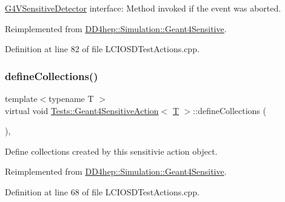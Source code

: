 \hyperlink{class_g4_v_sensitive_detector}{G4\+V\+Sensitive\+Detector} interface\+: Method invoked if the event was aborted. 



Reimplemented from \hyperlink{class_d_d4hep_1_1_simulation_1_1_geant4_sensitive_a3bb1c2f79261a98e83ec22102281d117}{D\+D4hep\+::\+Simulation\+::\+Geant4\+Sensitive}.



Definition at line 82 of file L\+C\+I\+O\+S\+D\+Test\+Actions.\+cpp.

\hypertarget{class_tests_1_1_geant4_sensitive_action_a0083f23f8b2160bc6e03ccd11077182c}{}\label{class_tests_1_1_geant4_sensitive_action_a0083f23f8b2160bc6e03ccd11077182c} 
\subsubsection{\texorpdfstring{define\+Collections()}{defineCollections()}\hspace{0.1cm}{\footnotesize\ttfamily [1/2]}}
{\footnotesize\ttfamily template$<$typename T $>$ \\
virtual void \hyperlink{class_tests_1_1_geant4_sensitive_action}{Tests\+::\+Geant4\+Sensitive\+Action}$<$ \hyperlink{class_t}{T} $>$\+::define\+Collections (\begin{DoxyParamCaption}{ }\end{DoxyParamCaption})\hspace{0.3cm}{\ttfamily [inline]}, {\ttfamily [virtual]}}



Define collections created by this sensitivie action object. 



Reimplemented from \hyperlink{class_d_d4hep_1_1_simulation_1_1_geant4_sensitive_a88c872b79e49e399c8ee282960c2d77d}{D\+D4hep\+::\+Simulation\+::\+Geant4\+Sensitive}.



Definition at line 68 of file L\+C\+I\+O\+S\+D\+Test\+Actions.\+cpp.

\hypertarget{class_tests_1_1_geant4_sensitive_action_ae9b3b49c444bf20e0611d8532cbd7d45}{}\label{class_tests_1_1_geant4_sensitive_action_ae9b3b49c444bf20e0611d8532cbd7d45} 
